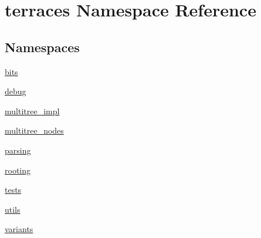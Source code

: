 \hypertarget{namespaceterraces}{}\section{terraces Namespace Reference}
\label{namespaceterraces}
\subsection*{Namespaces}
\begin{DoxyCompactItemize}
\item 
 \hyperlink{namespaceterraces_1_1bits}{bits}
\item 
 \hyperlink{namespaceterraces_1_1debug}{debug}
\item 
 \hyperlink{namespaceterraces_1_1multitree__impl}{multitree\+\_\+impl}
\item 
 \hyperlink{namespaceterraces_1_1multitree__nodes}{multitree\+\_\+nodes}
\item 
 \hyperlink{namespaceterraces_1_1parsing}{parsing}
\item 
 \hyperlink{namespaceterraces_1_1rooting}{rooting}
\item 
 \hyperlink{namespaceterraces_1_1tests}{tests}
\item 
 \hyperlink{namespaceterraces_1_1utils}{utils}
\item 
 \hyperlink{namespaceterraces_1_1variants}{variants}
\end{DoxyCompactItemize}
